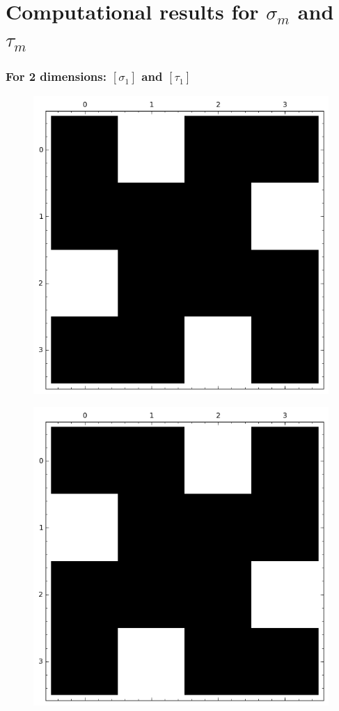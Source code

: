 \documentclass[pdf,sprung,slideColor,nocolorBG]{beamer}
\newenvironment{colortheme}[1]{
\def\ProvidesPackageRCS $##1${\relax}
\renewcommand{\ProcessOptions}{\relax}
\makeatletter

\makeatother
}{}
\begin{document}
\section{Computational results for $\sigma_m$ and $\tau_m$}

\begin{colortheme}{jubata}

\begin{frame}
\frametitle{For 2 dimensions: $[\sigma_1]$ and $[\tau_1]$}
\begin{figure}
\centering
\begin{minipage}{.48\textwidth}
  \centering
  \includegraphics[width=.9\linewidth]{../matrix_plot/sigma_1_bent_cayley_graph_index_matrix.png}
  \label{fig:sigma_1_bent_cayley_graph_index_matrix}
\end{minipage}%
\begin{minipage}{.48\textwidth}
  \centering
  \includegraphics[width=.9\linewidth]{../matrix_plot/tau_1_bent_cayley_graph_index_matrix.png}

\end{minipage}
\end{figure}
\end{frame}
\end{colortheme}
\end{document}
